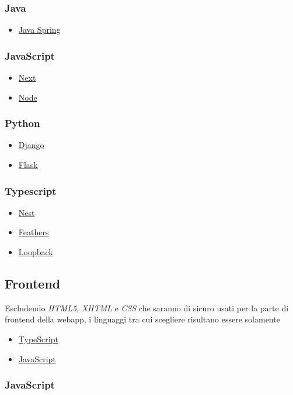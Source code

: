 \documentclass[a4paper, 12pt]{article}
\begin{document}
\subsubsection{Java}
\begin{itemize}
    \item \href{https://spring.io/}{Java Spring}
\end{itemize}
\subsubsection{JavaScript}
\begin{itemize}
    \item \href{https://nextjs.org/}{Next}
    \item \href{https://nodejs.org/}{Node}
\end{itemize}
\subsubsection{Python}
\begin{itemize}
    \item \href{https://www.djangoproject.com/}{Django}
    \item \href{https://flask.palletsprojects.com/}{Flask}
\end{itemize}
\subsubsection{Typescript}
\begin{itemize}
    \item \href{https://nestjs.com/}{Nest}
    \item \href{https://feathersjs.com/}{Feathers}
    \item \href{https://loopback.io/}{Loopback}
\end{itemize}
\subsection{Frontend}
Escludendo \textit{HTML5}, \textit{XHTML} e \textit{CSS} che saranno di sicuro usati per la parte di frontend della webapp, i linguaggi tra cui scegliere risultano essere solamente
\begin{itemize}
    \item \href{https://www.typescriptlang.org/}{TypeScript}
    \item \href{https://www.javascript.com/}{JavaScript}
\end{itemize}
\subsubsection{JavaScript}
\end{document}
